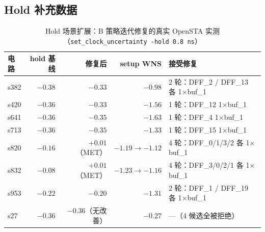 \documentclass[journal]{IEEEtran}
\begin{document}
\begin{appendices}
\section{Hold 补充数据}\label{app:hold}

\begin{table}[!htbp]
\centering
\caption{Hold 场景扩展：B 策略迭代修复的真实 OpenSTA 实测（\texttt{set\_clock\_uncertainty -hold 0.8\,ns}）}
\label{tab:hold}
\scriptsize
\setlength{\tabcolsep}{2pt}
\begin{tabular}{lrrrp{2.0cm}}
\toprule
\textbf{电路} & \textbf{hold 基线} & \textbf{修复后} & \textbf{setup WNS} & \textbf{接受修复} \\
\midrule
s382 & $-0.38$ & $-0.33$ & $-0.98$ & 2 轮：DFF\_2 / DFF\_13 各 1$\times$buf\_1 \\
s420 & $-0.36$ & $-0.33$ & $-1.56$ & 1 轮：DFF\_12 1$\times$buf\_1 \\
s641 & $-0.36$ & $-0.35$ & $-1.63$ & 1 轮：DFF\_4 1$\times$buf\_1 \\
s713 & $-0.36$ & $-0.35$ & $-1.33$ & 1 轮：DFF\_15 1$\times$buf\_1 \\
s820 & $-0.16$ & $+0.01$（MET） & $-1.19\rightarrow -1.12$ & 4 轮：DFF\_0/1/3/2 各 1$\times$buf\_1 \\
s832 & $-0.08$ & $+0.01$（MET） & $-1.23\rightarrow -1.16$ & 4 轮：DFF\_3/0/2/1 各 1$\times$buf\_1 \\
s953 & $-0.22$ & $-0.20$ & $-1.31$ & 2 轮：DFF\_1 / DFF\_19 各 1$\times$buf\_1 \\
s27 & $-0.36$ & $-0.36$（无改善） & $-0.27$ & ---（4 候选全被拒绝） \\
\bottomrule
\end{tabular}
\end{table}

\end{appendices}
\end{document}
